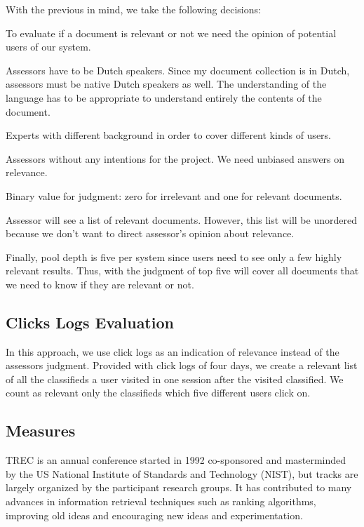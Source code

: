 With the previous in mind, we take the following decisions:

\begin{list}{.}{}
\item{To evaluate if a document is relevant or not  we need the opinion of potential users of our system.}
\item{Assessors have to be Dutch speakers. Since my document collection is in Dutch, assessors must be native Dutch speakers as well. The understanding of the language has to be appropriate to understand entirely the contents of the document.}
\item{Experts with different background in order to cover different kinds of users.}
\item{Assessors without any intentions for the project. We need unbiased answers on relevance.}
\item{Binary value for judgment: zero for irrelevant and one for relevant documents.}
\item{Assessor will see a list of relevant documents. However, this list will be unordered because we don't want to direct assessor's opinion about relevance.}
\item{Finally, pool depth is five per system since users need to see only a few highly relevant results. Thus, with the judgment of top five will cover all documents that we need to know if they are relevant or not.}
\end{list}




\subsection{Clicks Logs Evaluation}

In this approach, we use click logs as an indication of relevance instead of the assessors judgment. Provided with click logs of four days, we create a relevant list of all the classifieds a user visited in one session after the visited classified. We count as relevant only the classifieds which five different users click on.



\subsection{Measures}

TREC is an annual conference started in 1992 co-sponsored and masterminded by the US National Institute of Standards and Technology (NIST), but tracks are largely organized by the participant research groups. It has contributed to many advances in information retrieval techniques such as ranking algorithms, improving old ideas and encouraging new ideas and experimentation.

